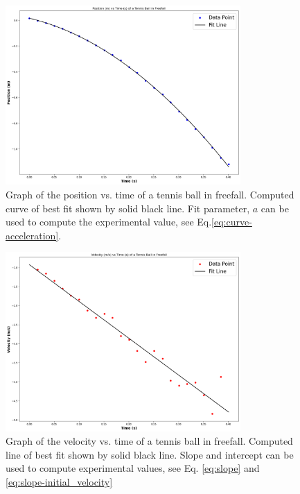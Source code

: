 \documentclass[titlepage]{article}
\begin{document}
\begin{figure}[H]
   \begin{center}
      \includegraphics[width=0.8\textwidth]{phys144lab3-position_time_graph.png} 
   \end{center}
   \caption{Graph of the position vs. time of a tennis ball in freefall. Computed curve of best fit shown by solid black line. Fit parameter, $a$ can be used to compute the experimental value, see Eq.\ref{eq:curve-acceleration}.}
\end{figure}

\begin{figure}[H]
   \begin{center}
      \includegraphics[width=0.8\textwidth]{phys144lab3-velocity_time_graph.png} 
   \end{center}
   \caption{Graph of the velocity vs. time of a tennis ball in freefall. Computed line of best fit shown by solid black line. Slope and intercept can be used to compute experimental values, see Eq. \ref{eq:slope} and \ref{eq:slope-initial_velocity} }
\end{figure}
\end{document}
